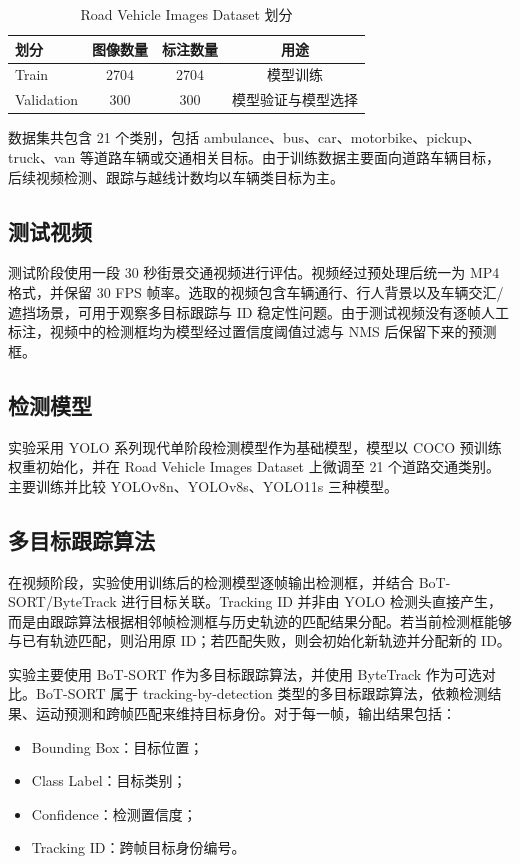 \documentclass[UTF8,a4paper,12pt]{ctexart}
\begin{document}
\begin{table}[H]
    \centering
    \caption{Road Vehicle Images Dataset 划分}
    \begin{tabular}{lccc}
        \toprule
        划分 & 图像数量 & 标注数量 & 用途 \\
        \midrule
        Train & 2704 & 2704 & 模型训练 \\
        Validation & 300 & 300 & 模型验证与模型选择 \\
        \bottomrule
    \end{tabular}
\end{table}

数据集共包含 21 个类别，包括 ambulance、bus、car、motorbike、pickup、truck、van 等道路车辆或交通相关目标。由于训练数据主要面向道路车辆目标，后续视频检测、跟踪与越线计数均以车辆类目标为主。

\subsection{测试视频}

测试阶段使用一段 30 秒街景交通视频进行评估。视频经过预处理后统一为 MP4 格式，并保留 30 FPS 帧率。选取的视频包含车辆通行、行人背景以及车辆交汇/遮挡场景，可用于观察多目标跟踪与 ID 稳定性问题。由于测试视频没有逐帧人工标注，视频中的检测框均为模型经过置信度阈值过滤与 NMS 后保留下来的预测框。

\subsection{检测模型}

实验采用 YOLO 系列现代单阶段检测模型作为基础模型，模型以 COCO 预训练权重初始化，并在 Road Vehicle Images Dataset 上微调至 21 个道路交通类别。主要训练并比较 YOLOv8n、YOLOv8s、YOLO11s 三种模型。


\subsection{多目标跟踪算法}

在视频阶段，实验使用训练后的检测模型逐帧输出检测框，并结合 BoT-SORT/ByteTrack 进行目标关联。Tracking ID 并非由 YOLO 检测头直接产生，而是由跟踪算法根据相邻帧检测框与历史轨迹的匹配结果分配。若当前检测框能够与已有轨迹匹配，则沿用原 ID；若匹配失败，则会初始化新轨迹并分配新的 ID。

实验主要使用 BoT-SORT 作为多目标跟踪算法，并使用 ByteTrack 作为可选对比。BoT-SORT 属于 tracking-by-detection 类型的多目标跟踪算法，依赖检测结果、运动预测和跨帧匹配来维持目标身份。对于每一帧，输出结果包括：
\begin{itemize}
    \item Bounding Box：目标位置；
    \item Class Label：目标类别；
    \item Confidence：检测置信度；
    \item Tracking ID：跨帧目标身份编号。
\end{itemize}
\end{document}
